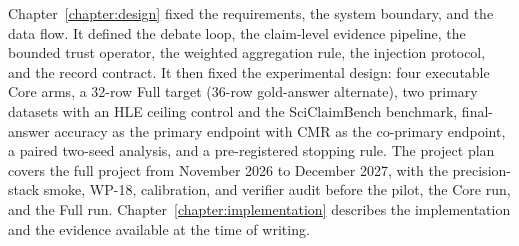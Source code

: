 Chapter~\ref{chapter:design} fixed the requirements, the system boundary, and the data flow. It defined the debate loop, the claim-level evidence pipeline, the bounded trust operator, the weighted aggregation rule, the injection protocol, and the record contract. It then fixed the experimental design: four executable Core arms, a 32-row Full target (36-row gold-answer alternate), two primary datasets with an HLE ceiling control and the SciClaimBench benchmark, final-answer accuracy as the primary endpoint with CMR as the co-primary endpoint, a paired two-seed analysis, and a pre-registered stopping rule. The project plan covers the full project from November 2026 to December 2027, with the precision-stack smoke, WP-18, calibration, and verifier audit before the pilot, the Core run, and the Full run. Chapter~\ref{chapter:implementation} describes the implementation and the evidence available at the time of writing.
